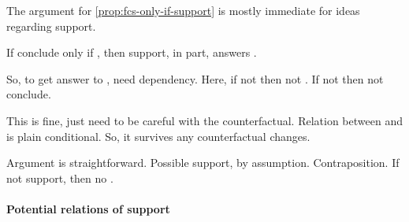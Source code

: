 \begin{note}
  The argument for \autoref{prop:fcs-only-if-support} is {\color{red} mostly immediate for ideas regarding support}.

  \begin{goal}
    If conclude only if \fc{}, then support, in part, answers \qWhyV{}.
  \end{goal}

  So, to get answer to \qWhyV{}, need dependency.
  Here, if not \support{} then not \fc{}.
  If not \fc{} then not conclude.

  This is fine, just need to be careful with the counterfactual.
  Relation between \support{} and \fc{} is plain conditional.
  So, it survives any counterfactual changes.
\end{note}

\begin{note}[Argument]
  Argument is straightforward.
  Possible support, by assumption.
  Contraposition.
  If not support, then no \fc{}.
\end{note}

\paragraph{Potential relations of support}

